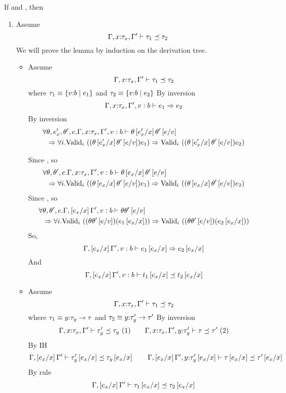 If  and , then 
\begin{enumerate}
\item\label{proof:sub:sub} Assume
	$$\issubtype{\Gamma, x\colon\tau_x, \Gamma'}{\tau_1}{\tau_2}$$
We will prove the lemma by induction on the derivation tree.
\begin{itemize}
\item \rsubbase
Assume
	$$\issubtype{\Gamma, x\colon\tau_x, \Gamma'}{\tau_1}{\tau_2}$$
where $\tau_1 \equiv \tref{v}{b}{e_1}$
and   $\tau_2 \equiv \tref{v}{b}{e_2}$
By inversion
	$$
	\issubref{\Gamma, x\colon\tau_x, \Gamma',v:b}{e_1}{e_2}
	$$
By inversion
	\begin{align*}
	\forall &\theta, e'_x, \theta',e .
	\iswellformed{\Gamma, x\colon\tau_x, \Gamma',v:b}{\theta\sub{x}{e'_x}\theta'\sub{v}{e}}\\& \Rightarrow
	\generalconditionImpl{(\theta\sub{x}{e'_x}\theta'\sub{v}{e})e_1}{(\theta\sub{x}{e'_x}\theta'\sub{v}{e})e_2}
	\end{align*}

Since , so
	\begin{align*}
	\forall &\theta, \theta',e .
	\iswellformed{\Gamma,x\colon\tau_x, \Gamma',v:b}{\theta \sub{x}{e_x}\theta'\sub{v}{e}}\\& \Rightarrow
	\generalconditionImpl{(\theta\sub{x}{e_x}\theta'\sub{v}{e})e_1}{(\theta\sub{x}{e_x}\theta'\sub{v}{e})e_2}
	\end{align*}
Since , so
	\begin{align*}
	\forall &\theta, \theta',e .
	\iswellformed{\Gamma,\sub{x}{e_x}\Gamma',v:b}{\theta\theta'\sub{v}{e}}\\& \Rightarrow
	\generalconditionImpl{(\theta\theta'\sub{v}{e})(e_1\sub{x}{e_x})}
						 {(\theta\theta'\sub{v}{e})(e_2\sub{x}{e_x})}
	\end{align*}
So,
	$$
	\issubref{\Gamma, \sub{x}{e_x}\Gamma',v:b}{e_1\sub{x}{e_x}}{e_2\sub{x}{e_x}}
	$$
And
	$$
	\issubtype{\Gamma, \sub{x}{e_x}\Gamma',v:b}{t_1\sub{x}{e_x}}{t_2\sub{x}{e_x}}
	$$
\item \rsubfun
Assume
	$$\issubtype{\Gamma, x\colon\tau_x, \Gamma'}{\tau_1}{\tau_2}$$
where $\tau_1 \equiv \tfun{y}{\tau_y}{\tau}$
and   $\tau_2 \equiv \tfun{y}{\tau'_y}{\tau'}$
By inversion
	$$
	\issubtype{\Gamma, x\colon\tau_x, \Gamma'}{\tau'_y}{\tau_y}\ (1) \qquad
	\issubtype{\Gamma, x\colon\tau_x, \Gamma',y\colon\tau'_y}{\tau}{\tau'}\ (2)
	$$
By IH	
	$$
	\issubtype{\Gamma, \sub{x}{e_x}\Gamma'}{\tau'_y\sub{x}{e_x}}{\tau_y\sub{x}{e_x}} \qquad
	\issubtype{\Gamma, \sub{x}{e_x}\Gamma',y\colon\tau'_y\sub{x}{e_x}}{\tau\sub{x}{e_x}}{\tau'\sub{x}{e_x}}
	$$
By rule \rsubfun	
	$$
	\issubtype{\Gamma, \sub{x}{e_x}\Gamma'}{\tau_1\sub{x}{e_x}}{\tau_2\sub{x}{e_x}}
	$$
\end{itemize}


\end{enumerate}
